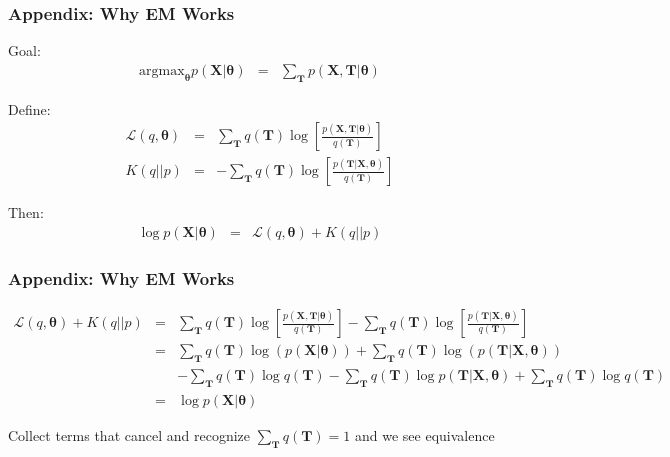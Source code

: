 \documentclass{beamer}
\numberwithin{equation}{section}
\begin{document}
\begin{frame}
\frametitle{Appendix: Why EM Works}

Goal: 
\begin{eqnarray}
\text{argmax}_{\boldsymbol{\theta}} p(\boldsymbol{X}| \boldsymbol{\theta} ) & = & \sum_{\boldsymbol{T}} p(\boldsymbol{X}, \boldsymbol{T}|\boldsymbol{\theta}) \nonumber 
\end{eqnarray}

Define: 
\begin{eqnarray}
\mathcal{L}(q, \boldsymbol{\theta}) & = & \sum_{\boldsymbol{T}} q(\boldsymbol{T}) \log \left[ \frac{ p(\boldsymbol{X}, \boldsymbol{T}| \boldsymbol{\theta}) }{q(\boldsymbol{T} )}   \right] \nonumber \\
K(q||p) & = & - \sum_{\boldsymbol{T}} q(\boldsymbol{T}) \log \left[ \frac{p(\boldsymbol{T}| \boldsymbol{X}, \boldsymbol{\theta}) }{q(\boldsymbol{T})}    \right] \nonumber 
\end{eqnarray}

Then: 
\begin{eqnarray}
\log p(\boldsymbol{X}| \boldsymbol{\theta}) & = & \mathcal{L}(q, \boldsymbol{\theta})  + K(q||p) \nonumber 
\end{eqnarray}



\end{frame}

\begin{frame}
\frametitle{Appendix: Why EM Works}

\begin{footnotesize}
\begin{eqnarray}
\mathcal{L}(q, \boldsymbol{\theta})  + K(q||p) & = & \sum_{\boldsymbol{T}} q(\boldsymbol{T}) \log \left[ \frac{ p(\boldsymbol{X}, \boldsymbol{T}| \boldsymbol{\theta}) }{q(\boldsymbol{T} )}   \right] - \sum_{\boldsymbol{T}} q(\boldsymbol{T}) \log \left[ \frac{p(\boldsymbol{T}| \boldsymbol{X}, \boldsymbol{\theta}) }{q(\boldsymbol{T})}    \right] \nonumber \\
& =& \sum_{\boldsymbol{T} } q(\boldsymbol{T}) \log(p(\boldsymbol{X}|\boldsymbol{\theta}) ) + \sum_{\boldsymbol{T} } q(\boldsymbol{T}) \log (p(\boldsymbol{T}|\boldsymbol{X}, \boldsymbol{\theta}) )  \nonumber \\
&&  - \sum_{\boldsymbol{T}} q(\boldsymbol{T}) \log q(\boldsymbol{T}) - \sum_{\boldsymbol{T}} q(\boldsymbol{T}) \log p(\boldsymbol{T}|\boldsymbol{X}, \boldsymbol{\theta}) + \sum_{\boldsymbol{T}} q(\boldsymbol{T}) \log q(\boldsymbol{T}) \nonumber \\
& = & \log p(\boldsymbol{X}| \boldsymbol{\theta}) \nonumber 
\end{eqnarray}
\end{footnotesize}

Collect terms that cancel and recognize $\sum_{\boldsymbol{T}} q(\boldsymbol{T}) = 1$ and we see equivalence


\end{frame}
\end{document}
